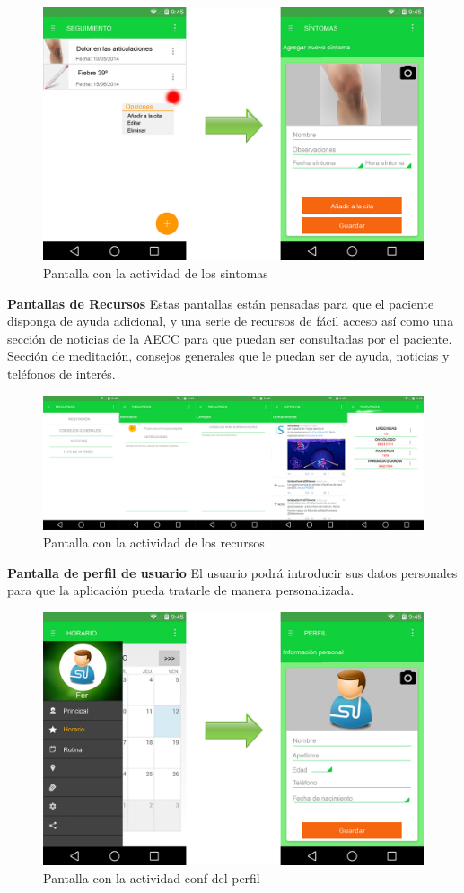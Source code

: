 \documentclass[../pfc.tex]{subfiles}
\begin{document}
			\begin{figure}
				\centering
				\includegraphics[width=0.7\linewidth]{../images/sintomas}
				\caption{Pantalla con la actividad de los sintomas}
				\label{fig:sintomas}
			\end{figure}
			
			
			\textbf{Pantallas de Recursos}
			Estas pantallas están pensadas para que el paciente disponga de ayuda adicional, y una serie de recursos de fácil acceso así como una sección de noticias de la AECC para que puedan ser consultadas por el paciente.
			Sección de meditación, consejos generales que le puedan ser de ayuda, noticias y teléfonos de interés. 
			
			\begin{figure}
				\centering
				\includegraphics[width=0.7\linewidth]{../images/recursos}
				\caption{Pantalla con la actividad de los recursos}
				\label{fig:recursos}
			\end{figure}
			
			
			\textbf{Pantalla de perfil de usuario}
			El usuario podrá introducir sus datos personales para que la aplicación pueda tratarle de manera personalizada.
			
			\begin{figure}
				\centering
				\includegraphics[width=0.7\linewidth]{../images/perfil_2}
				\caption{Pantalla con la actividad conf del perfil}
				\label{fig:perfil_2}
			\end{figure}
			
\end{document}
